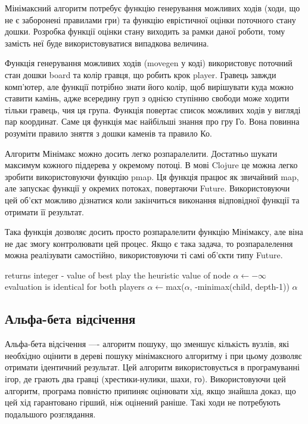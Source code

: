 Мінімаксний алгоритм потребує функцію генерування можливих ходів (ходи, що не є заборонені правилами гри) та функцію еврістичної оцінки поточного стану дошки. Розробка функції оцінки стану виходить за рамки даної роботи, тому замість неї буде використовуватися випадкова величина.

Функція генерування можливих ходів (movegen у коді) використовує поточний стан дошки board та колір гравця, що робить крок player. Гравець завжди комп'ютер, але функції потрібно знати його колір, щоб вирішувати куда можно ставити камінь, адже всередину груп з однією ступінню свободи може ходити тільки гравець, чия ця група. Функція повертає список можливих ходів у вигляді пар координат. Саме ця функція має найбільші знання про гру Го. Вона повинна розуміти правило зняття з дошки каменів та правило Ко.

Алгоритм Мінімакс можно досить легко розпаралелити. Достатньо шукати максимум кожного піддерева у окремому потоці. В мові Clojure це можна легко зробити використовуючи функцію pmap. Ця функція працює як звичайний map, але запускає функції у окремих потоках, повертаючи Future. Використовуючи цей об'єкт можливо дізнатися коли закінчиться виконання відповідної функції та отримати її результат.

Така функція дозволяє досить просто розпаралелити функцію Мінімаксу, але віна не дає змогу контролювати цей процес. Якщо є така задача, то розпаралелення можна реалізувати самостійно, використовуючи ті самі об'єкти типу Future.

\begin{algorithmic}
	\Comment returns integer - value of best play
			\State \Return the heuristic value of node
		\EndIf
	    \State $\alpha\gets-\infty$
			\Comment evaluation is identical for both players
			\State $\alpha\gets$max($\alpha$, -minimax(child, depth-1))
		\EndFor
		\State \Return $\alpha$
	\EndFunction
\end{algorithmic}

\subsection{Альфа-бета відсічення}
Альфа-бета відсічення —- алгоритм пошуку, що зменшує кількість вузлів, які необхідно оцінити в дереві пошуку мінімаксного алгоритму і при цьому дозволяє отримати ідентичний результат. Цей алгоритм використовується в програмуванні ігор, де грають два гравці (хрестики-нулики, шахи, го). Використовуючи цей алгоритм, програма повністю припиняє оцінювати хід, якщо знайшла доказ, що цей хід гарантовано гірший, ніж оцінений раніше. Такі ходи не потребують подальшого розглядання.

